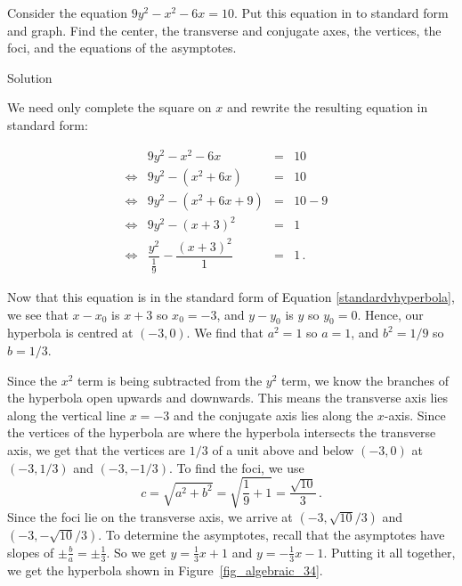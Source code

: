 \ifvc
\begin{example}
 \label{ctshyperbolaex} 
Consider the equation $9y^2-x^2-6x=10$.  Put this equation in to standard form and graph.  Find the center, the transverse and conjugate axes, the vertices, the foci, and the equations of the asymptotes.   

Solution 


We need only complete the square on $x$ and rewrite the resulting equation in standard form:

\[ \begin{array}{rrclr} 
&9y^2-x^2-6x & = & 10 & \\[5pt]
\Leftrightarrow&9y^2-\left(x^2+6x\right) &  = & 10 &  \\[5pt]
\Leftrightarrow&9y^2-\left(x^2+6x + 9\right) &  = & 10 - 9 &  \\[5pt]
\Leftrightarrow&9y^2-(x+3)^2 &  = & 1 &  \\ [5pt]
\Leftrightarrow&\dfrac{y^2}{\frac{1}{9}} - \dfrac{(x+3)^2}{1} & = & 1\,.&  \end{array} \]


Now that this equation is in the standard form of Equation \ref{standardvhyperbola}, we see that $x-x_0$ is $x+3$ so $x_0 = -3$, and $y-y_0$ is $y$ so $y_0 = 0$.  Hence, our hyperbola is centred at $(-3, 0)$.  We find that $a^2 = 1$ so $a=1$, and $b^2 = 1/9$ so  $b=1/3$.  

Since the $x^2$ term is being subtracted from the $y^2$ term, we know the branches of the hyperbola open upwards and downwards.  This means the transverse axis lies along the vertical line $x=-3$ and the conjugate axis lies along the $x$-axis.  Since the vertices of the hyperbola are where the hyperbola intersects the transverse axis, we get that the vertices are $1/3$ of a unit above and below $(-3, 0)$ at $\left(-3, 1/3\right)$ and $\left(-3, -1/3\right)$.  To find the foci, we use 
$$
c = \sqrt{a^2 + b^2} = \sqrt{\frac{1}{9} + 1} = \frac{\sqrt{10}}{3}\,.
$$
Since the foci lie on the transverse axis, we arrive at $\left(-3, \sqrt{10}/3\right)$ and $\left(-3, -\sqrt{10}/3\right)$.  To determine the asymptotes, recall that the asymptotes have slopes of $\pm \frac{b}{a} = \pm \frac{1}{3}$.  So we get  $y = \frac{1}{3}x + 1$ and $y = -\frac{1}{3}x - 1$.  Putting it all together, we get the hyperbola shown in Figure~\ref{fig_algebraic_34}.



\end{example}
